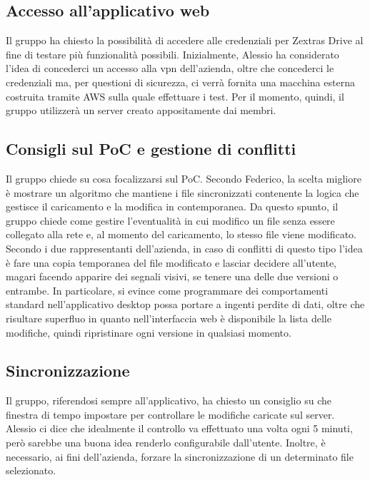 \subsection{Accesso all'applicativo web}
Il gruppo ha chiesto la possibilità di accedere alle credenziali per Zextras Drive al fine di testare più funzionalità possibili. Inizialmente, Alessio ha considerato l'idea di concederci un accesso alla vpn dell'azienda, oltre che concederci le credenziali ma, per questioni di sicurezza, ci verrà fornita una macchina esterna costruita tramite AWS sulla quale effettuare i test. Per il momento, quindi, il gruppo utilizzerà un server creato appositamente dai membri.
\subsection{Consigli sul PoC e gestione di conflitti}
Il gruppo chiede su cosa focalizzarsi sul PoC. Secondo Federico, la scelta migliore è mostrare un algoritmo che mantiene i file sincronizzati contenente la logica che gestisce il caricamento e la modifica in contemporanea. Da questo spunto, il gruppo chiede come gestire l'eventualità in cui modifico un file senza essere collegato alla rete e, al momento del caricamento, lo stesso file viene modificato. Secondo i due rappresentanti dell'azienda, in caso di conflitti di questo tipo l'idea è fare una copia temporanea del file modificato e lasciar decidere all'utente, magari facendo apparire dei segnali visivi, se tenere una delle due versioni o entrambe.  In particolare, si evince come programmare dei comportamenti standard nell'applicativo desktop possa portare a ingenti perdite di dati, oltre che risultare superfluo in quanto nell'interfaccia web è disponibile la lista delle modifiche, quindi ripristinare ogni versione in qualsiasi momento. 
\subsection{Sincronizzazione}
Il gruppo, riferendosi sempre all'applicativo, ha chiesto un consiglio su che finestra di tempo impostare per controllare le modifiche caricate sul server. Alessio ci dice che idealmente il controllo va effettuato una volta ogni 5 minuti, però sarebbe una buona idea renderlo configurabile dall'utente. Inoltre, è necessario, ai fini dell'azienda, forzare la sincronizzazione di un determinato file selezionato.
\newpage

